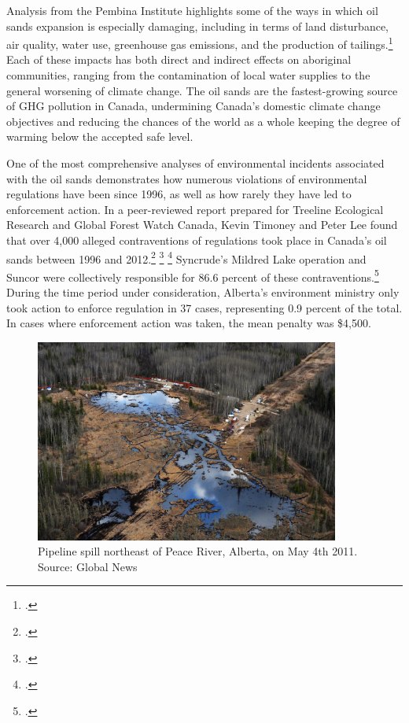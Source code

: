 Analysis from the Pembina Institute highlights some of the ways in which oil sands expansion is especially damaging, including in terms of land disturbance, air quality, water use, greenhouse gas emissions, and the production of tailings.\footcite[][p. 1]{PembinaOilsandsExpansion}
Each of these impacts has both direct and indirect effects on aboriginal communities, ranging from the contamination of local water supplies to the general worsening of climate change.
The oil sands are the fastest-growing source of GHG pollution in Canada, undermining Canada's domestic climate change objectives and reducing the chances of the world as a whole keeping the degree of warming below the accepted safe level.



One of the most comprehensive analyses of environmental incidents associated with the oil sands demonstrates how numerous violations of environmental regulations have been since 1996, as well as how rarely they have led to enforcement action.
In a peer-reviewed report prepared for Treeline Ecological Research and Global Forest Watch Canada, Kevin Timoney and Peter Lee found that over 4,000 alleged contraventions of regulations took place in Canada's oil sands between 1996 and 2012.\footcite[][p. 8]{OnePercentReport} \footcite[See also: ][]{GlobalFewerOnePercent} \footcite[See also: ][]{FinPoOnePercent}
Syncrude's Mildred Lake operation and Suncor were collectively responsible for 86.6 percent of these contraventions.\footcite[][p. 8]{OnePercentReport}
During the time period under consideration, Alberta's environment ministry only took action to enforce regulation in 37 cases, representing 0.9 percent of the total.
In cases where enforcement action was taken, the mean penalty was \$4,500.



\begin{figure}[h]
\includegraphics[width=100mm]{s3-pipeline-spill.png}
\centering
\caption{Pipeline spill northeast of Peace River, Alberta, on May 4th 2011. Source: Global News}
\label{fig:s3-pipeline-spill}
\end{figure}



